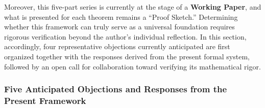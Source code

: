 \documentclass[11pt,a4paper]{article}
\theoremstyle{definition}
\theoremstyle{plain}
\begin{document}
Moreover, this five-part series is currently at the stage of a \textbf{Working Paper}, and what is presented for each theorem remains a ``Proof Sketch.'' Determining whether this framework can truly serve as a universal foundation requires rigorous verification beyond the author's individual reflection. In this section, accordingly, four representative objections currently anticipated are first organized together with the responses derived from the present formal system, followed by an open call for collaboration toward verifying its mathematical rigor.

\subsubsection*{Five Anticipated Objections and Responses from the Present Framework}
\end{document}
